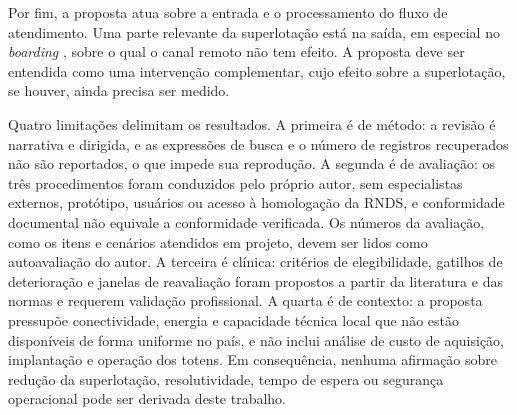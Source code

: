 
Por fim, a proposta atua sobre a entrada e o processamento do fluxo de atendimento. Uma parte relevante da superlotação está na saída, em especial no \textit{boarding} \cite{savioli2022}, sobre o qual o canal remoto não tem efeito. A proposta deve ser entendida como uma intervenção complementar, cujo efeito sobre a superlotação, se houver, ainda precisa ser medido.

\label{sec:res-limitacoes}

Quatro limitações delimitam os resultados. A primeira é de método: a revisão é narrativa e dirigida, e as expressões de busca e o número de registros recuperados não são reportados, o que impede sua reprodução. A segunda é de avaliação: os três procedimentos foram conduzidos pelo próprio autor, sem especialistas externos, protótipo, usuários ou acesso à homologação da RNDS, e conformidade documental não equivale a conformidade verificada. Os números da avaliação, como os itens e cenários atendidos em projeto, devem ser lidos como autoavaliação do autor. A terceira é clínica: critérios de elegibilidade, gatilhos de deterioração e janelas de reavaliação foram propostos a partir da literatura e das normas e requerem validação profissional. A quarta é de contexto: a proposta pressupõe conectividade, energia e capacidade técnica local que não estão disponíveis de forma uniforme no país, e não inclui análise de custo de aquisição, implantação e operação dos totens. Em consequência, nenhuma afirmação sobre redução da superlotação, resolutividade, tempo de espera ou segurança operacional pode ser derivada deste trabalho.
